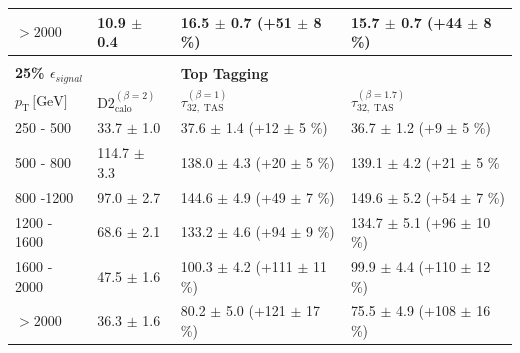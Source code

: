 \begin{table}
\begin{tabular}{llll}
\multicolumn{1}{l||}{$>2000$}                     	  & \multicolumn{1}{l|}{10.9 $\pm$ 0.4}                      & \multicolumn{1}{l|}{\cellcolor{Red!50}16.5 $\pm$ 0.7 (+51 $\pm$ 8 \%)}        & \multicolumn{1}{l|}{15.7 $\pm$ 0.7 (+44 $\pm$ 8 \%)}       \\ \hline
                                                     &                                                &                                          &                                          \\
 \multicolumn{1}{l||}{\textbf{25\% $\epsilon_{signal}$}} &                                                &  \textbf{Top Tagging}                                        &                                          \\ \hline
\multicolumn{1}{l||}{$p_{\mathrm{T}} \, \text{[GeV]}$}           & \multicolumn{1}{l|}{$\text{D2}_{\text{calo}}^{(\beta=2)}$} & \multicolumn{1}{l|}{$\tau_{32,\;\text{TAS}}^{(\beta=1)}$} & \multicolumn{1}{l|}{$\tau_{32,\;\text{TAS}}^{(\beta=1.7)}$} \\ \hline \hline
\multicolumn{1}{l||}{250 - 500}                       & \multicolumn{1}{l|}{33.7 $\pm$ 1.0}                     & \multicolumn{1}{l|}{\cellcolor{Red!50}37.6 $\pm$ 1.4 (+12 $\pm$ 5 \%)}       & \multicolumn{1}{l|}{36.7 $\pm$ 1.2 (+9 $\pm$ 5 \%)}       \\
\multicolumn{1}{l||}{500 - 800}                       & \multicolumn{1}{l|}{114.7 $\pm$ 3.3}                    & \multicolumn{1}{l|}{138.0 $\pm$ 4.3 (+20 $\pm$ 5 \%)}       & \multicolumn{1}{l|}{\cellcolor{Red!50}139.1 $\pm$ 4.2 (+21 $\pm$ 5 \%}        \\
\multicolumn{1}{l||}{800 -1200}                       & \multicolumn{1}{l|}{97.0 $\pm$ 2.7}                     & \multicolumn{1}{l|}{144.6 $\pm$ 4.9 (+49 $\pm$ 7 \%)}       & \multicolumn{1}{l|}{\cellcolor{Red!50}149.6 $\pm$ 5.2 (+54 $\pm$ 7 \%)}       \\
\multicolumn{1}{l||}{1200 - 1600}                     & \multicolumn{1}{l|}{68.6 $\pm$ 2.1}                     & \multicolumn{1}{l|}{133.2 $\pm$ 4.6 (+94 $\pm$ 9 \%)}       & \multicolumn{1}{l|}{\cellcolor{Red!50}134.7 $\pm$ 5.1 (+96 $\pm$ 10 \%)}      \\
\multicolumn{1}{l||}{1600 - 2000}                     & \multicolumn{1}{l|}{47.5 $\pm$ 1.6}                     & \multicolumn{1}{l|}{\cellcolor{Red!50}100.3 $\pm$ 4.2 (+111 $\pm$ 11 \%)}      & \multicolumn{1}{l|}{99.9 $\pm$ 4.4 (+110 $\pm$ 12 \%)}       \\ 
\multicolumn{1}{l||}{$>2000$}                         & \multicolumn{1}{l|}{36.3 $\pm$ 1.6}                     & \multicolumn{1}{l|}{\cellcolor{Red!50}80.2 $\pm$ 5.0 (+121 $\pm$ 17 \%)}      & \multicolumn{1}{l|}{75.5 $\pm$ 4.9 (+108 $\pm$ 16 \%)}       \\ \hline

\end{tabular}
\end{table}
